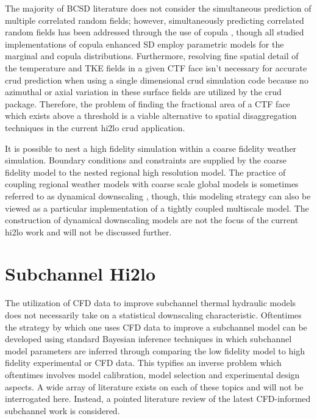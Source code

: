 The majority of BCSD literature does not consider the simultaneous prediction of multiple correlated random fields; however, simultaneously predicting correlated random fields has been addressed through the use of copula \cite{alaya2014}, though all studied implementations of copula enhanced SD employ parametric models for the marginal and copula distributions.  Furthermore, resolving fine spatial detail of the temperature and TKE fields in a given CTF face isn't necessary for accurate crud prediction when using a single dimensional crud simulation code because no azimuthal or axial variation in these surface fields are utilized by the crud package.  Therefore, the problem of finding the fractional area of a CTF face which exists above a threshold is a viable alternative to spatial disaggregation techniques in the current hi2lo crud application.

It is possible to nest a high fidelity simulation within a coarse fidelity weather simulation. Boundary conditions and constraints are supplied by the coarse fidelity model to the nested regional high resolution model.  The practice of coupling regional weather models with coarse scale global models is sometimes referred to as dynamical downscaling \cite{Caldwell2009}, though, this modeling strategy can also be viewed as a particular implementation of a tightly coupled multiscale model.  The construction of dynamical downscaling models are not the focus of the current hi2lo work and will not be discussed further.



\section{Subchannel Hi2lo}

The utilization of CFD data to improve subchannel thermal hydraulic models does not necessarily take on a statistical downscaling characteristic.  Oftentimes the strategy by which one uses CFD data to improve a subchannel model can be developed using standard Bayesian inference techniques in which subchannel model parameters are inferred through comparing the low fidelity model to high fidelity experimental or CFD data.  This typifies an inverse problem which oftentimes involves  model calibration, model selection and experimental design aspects.  A wide array of literature exists on each of these topics and will not be interrogated here.  Instead, a pointed literature review of the latest CFD-informed subchannel work is considered.


